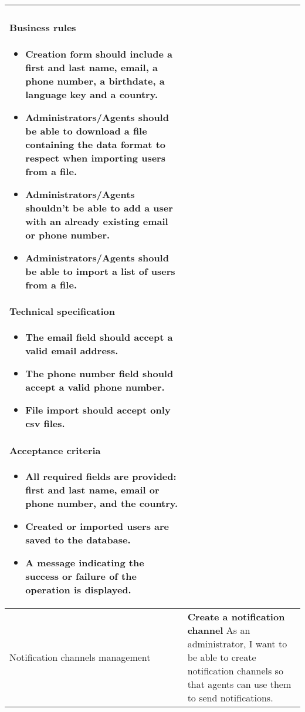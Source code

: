 \begin{longtable}{ | m{} | m{} | }
    \paragraph*{Business rules} \mbox{} \newline
    \begin{itemize}
        \item Creation form should include a first and last name, email, a phone number,
              a birthdate, a language key and a country.
        \item Administrators/Agents should be able to download a file containing the data format
              to respect when importing users from a file.
        \item Administrators/Agents shouldn’t be able to add a user with an already existing
              email or phone number.
        \item Administrators/Agents should be able to import a list of users from a file.
    \end{itemize}
    \paragraph*{Technical specification} \mbox{} \newline
    \begin{itemize}
        \item The email field should accept a valid email address.
        \item The phone number field should accept a valid phone number.
        \item File import should accept only \acrshort{csv} files.
    \end{itemize}
    \paragraph*{Acceptance criteria} \mbox{} \newline
    \begin{itemize}
        \item All required fields are provided: first and last name, email or phone number, and the country.
        \item Created or imported users are saved to the database.
        \item A message indicating the success or failure of the operation is displayed.
    \end{itemize}                                                                                                                                                                   \\
    \hline
    Notification \newline channels \newline management & \textbf{Create a notification channel} \newline As an administrator, I want to be able to create notification channels so that agents can use them to send notifications.

\end{longtable}
